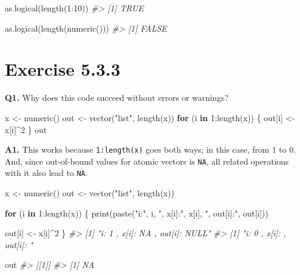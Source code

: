 \documentclass[
]{book}
\newenvironment{Shaded}{\begin{snugshade}}{\end{snugshade}}
\newcommand{\CommentTok}[1]{\textcolor[rgb]{0.56,0.35,0.01}{\textit{#1}}}
\newcommand{\ControlFlowTok}[1]{\textcolor[rgb]{0.13,0.29,0.53}{\textbf{#1}}}
\newcommand{\DecValTok}[1]{\textcolor[rgb]{0.00,0.00,0.81}{#1}}
\newcommand{\FunctionTok}[1]{\textcolor[rgb]{0.00,0.00,0.00}{#1}}
\newcommand{\NormalTok}[1]{#1}
\newcommand{\OtherTok}[1]{\textcolor[rgb]{0.56,0.35,0.01}{#1}}
\newcommand{\SpecialCharTok}[1]{\textcolor[rgb]{0.00,0.00,0.00}{#1}}
\newcommand{\StringTok}[1]{\textcolor[rgb]{0.31,0.60,0.02}{#1}}
\begin{document}
\begin{Shaded}
\begin{Highlighting}[]
\FunctionTok{as.logical}\NormalTok{(}\FunctionTok{length}\NormalTok{(}\DecValTok{1}\SpecialCharTok{:}\DecValTok{10}\NormalTok{))}
\CommentTok{\#\textgreater{} [1] TRUE}

\FunctionTok{as.logical}\NormalTok{(}\FunctionTok{length}\NormalTok{(}\FunctionTok{numeric}\NormalTok{()))}
\CommentTok{\#\textgreater{} [1] FALSE}
\end{Highlighting}
\end{Shaded}

\hypertarget{exercise-5.3.3}{%
\section{Exercise 5.3.3}\label{exercise-5.3.3}}

\textbf{Q1.} Why does this code succeed without errors or warnings?

\begin{Shaded}
\begin{Highlighting}[]
\NormalTok{x }\OtherTok{\textless{}{-}} \FunctionTok{numeric}\NormalTok{()}
\NormalTok{out }\OtherTok{\textless{}{-}} \FunctionTok{vector}\NormalTok{(}\StringTok{"list"}\NormalTok{, }\FunctionTok{length}\NormalTok{(x))}
\ControlFlowTok{for}\NormalTok{ (i }\ControlFlowTok{in} \DecValTok{1}\SpecialCharTok{:}\FunctionTok{length}\NormalTok{(x)) \{}
\NormalTok{  out[i] }\OtherTok{\textless{}{-}}\NormalTok{ x[i]}\SpecialCharTok{\^{}}\DecValTok{2}
\NormalTok{\}}
\NormalTok{out}
\end{Highlighting}
\end{Shaded}

\textbf{A1.} This works because \texttt{1:length(x)} goes both ways; in this case, from 1 to 0. And, since out-of-bound values for atomic vectors is \texttt{NA}, all related operations with it also lead to \texttt{NA}.

\begin{Shaded}
\begin{Highlighting}[]
\NormalTok{x }\OtherTok{\textless{}{-}} \FunctionTok{numeric}\NormalTok{()}
\NormalTok{out }\OtherTok{\textless{}{-}} \FunctionTok{vector}\NormalTok{(}\StringTok{"list"}\NormalTok{, }\FunctionTok{length}\NormalTok{(x))}

\ControlFlowTok{for}\NormalTok{ (i }\ControlFlowTok{in} \DecValTok{1}\SpecialCharTok{:}\FunctionTok{length}\NormalTok{(x)) \{}
  \FunctionTok{print}\NormalTok{(}\FunctionTok{paste}\NormalTok{(}\StringTok{"i:"}\NormalTok{, i, }\StringTok{", x[i]:"}\NormalTok{, x[i], }\StringTok{", out[i]:"}\NormalTok{, out[i]))}

\NormalTok{  out[i] }\OtherTok{\textless{}{-}}\NormalTok{ x[i]}\SpecialCharTok{\^{}}\DecValTok{2}
\NormalTok{\}}
\CommentTok{\#\textgreater{} [1] "i: 1 , x[i]: NA , out[i]: NULL"}
\CommentTok{\#\textgreater{} [1] "i: 0 , x[i]:  , out[i]: "}

\NormalTok{out}
\CommentTok{\#\textgreater{} [[1]]}
\CommentTok{\#\textgreater{} [1] NA}
\end{Highlighting}
\end{Shaded}
\end{document}
